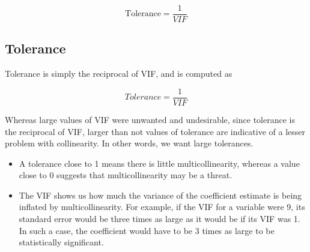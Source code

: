\documentclass[a4paper,12pt]{article}
\begin{document}
\[ \mbox{Tolerance} = \frac{1}{VIF}\]



\subsection*{Tolerance}
Tolerance is simply the reciprocal of VIF, and is computed as


\[ Tolerance = \frac{1}{VIF}\]

Whereas large values of VIF were unwanted and undesirable, since tolerance is the reciprocal
of VIF, larger than not values of tolerance are indicative of a lesser problem with collinearity.
In other words, we want large tolerances.

\begin{itemize}
\item A tolerance close to 1 means there is little multicollinearity, whereas a value close to 0
suggests that multicollinearity may be a threat.
\item The VIF shows us how much the variance of the coefficient estimate is being inflated by
multicollinearity. For example, if the VIF for a variable were 9, its standard error would
be three times as large as it would be if its VIF was 1. In such a case, the coefficient
would have to be 3 times as large to be statistically significant.
\end{itemize}
\end{document}

